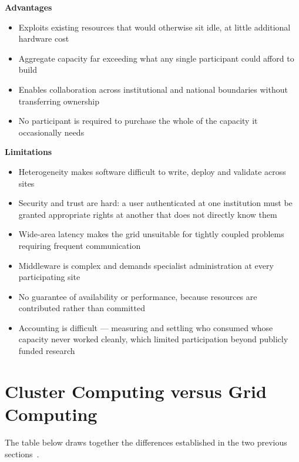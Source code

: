 \textbf{Advantages}
\begin{itemize}
  \item Exploits existing resources that would otherwise sit idle, at little
        additional hardware cost
  \item Aggregate capacity far exceeding what any single participant could
        afford to build
  \item Enables collaboration across institutional and national boundaries
        without transferring ownership
  \item No participant is required to purchase the whole of the capacity it
        occasionally needs
\end{itemize}

\textbf{Limitations}
\begin{itemize}
  \item Heterogeneity makes software difficult to write, deploy and validate
        across sites
  \item Security and trust are hard: a user authenticated at one institution
        must be granted appropriate rights at another that does not directly
        know them
  \item Wide-area latency makes the grid unsuitable for tightly coupled
        problems requiring frequent communication
  \item Middleware is complex and demands specialist administration at every
        participating site
  \item No guarantee of availability or performance, because resources are
        contributed rather than committed
  \item Accounting is difficult --- measuring and settling who consumed whose
        capacity never worked cleanly, which limited participation beyond
        publicly funded research
\end{itemize}

\section{Cluster Computing versus Grid Computing}

The table below draws together the differences established in the two
previous sections~.

